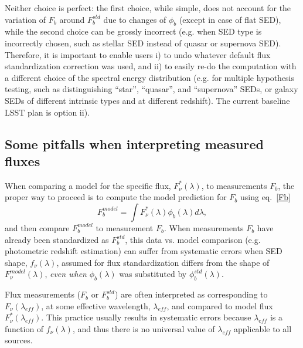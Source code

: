 \documentclass{emulateapj}
\begin{document}
Neither choice is perfect: the first choice, while simple, does not account for the variation of $F_b$ around
$F^{std}_b$ due to changes of $\phi_b$ (except in case of flat SED), while the second choice
can be grossly incorrect (e.g. when SED type is incorrectly chosen, such as stellar SED instead
of quasar or supernova SED). Therefore, it is important to enable users i) to undo whatever default 
flux standardization correction was used, and ii) to easily re-do the computation with a different choice 
of the spectral energy distribution (e.g. for multiple hypothesis testing, such as distinguishing
``star'', ``quasar'', and ``supernova'' SEDs, or galaxy SEDs of different intrinsic types and at 
different redshift). The current baseline LSST plan is option ii). 



\subsection{Some pitfalls when interpreting measured fluxes}

When comparing a model for the specific flux, $F_\nu^\ast(\lambda)$, to  
measurements $F_b$, the proper way to proceed is to compute the model prediction 
for $F_b$ using eq.~\ref{Fb}
\begin{equation}
\label{FbModel}
             F^{model}_b = \int{F_\nu^\ast(\lambda) \phi_b(\lambda) d\lambda},
\end{equation}
and then compare $F^{model}_b$ to measurement $F_b$.  
When measurements $F_b$ have already been standardized as $F^{std}_b$, 
this data vs. model comparison (e.g. photometric redshift estimation) can 
suffer from systematic errors when SED shape, $f_\nu(\lambda)$,  assumed 
for flux standardization differs from the shape of $F_\nu^{model}(\lambda)$,
{\it even when} $\phi_b(\lambda)$ was substituted by $\phi^{std}_b(\lambda)$. 

Flux measurements ($F_b$ or $F^{std}_b$) are often interpreted as corresponding to 
$F_\nu(\lambda_{eff})$, at some effective wavelength, $\lambda_{eff}$, and compared 
to model flux $F_\nu^\ast(\lambda_{eff})$. This practice usually results in systematic
errors because $\lambda_{eff}$ is a function of $f_\nu(\lambda)$, and thus there
is no universal value of $\lambda_{eff}$ applicable to all sources. 
\end{document}
